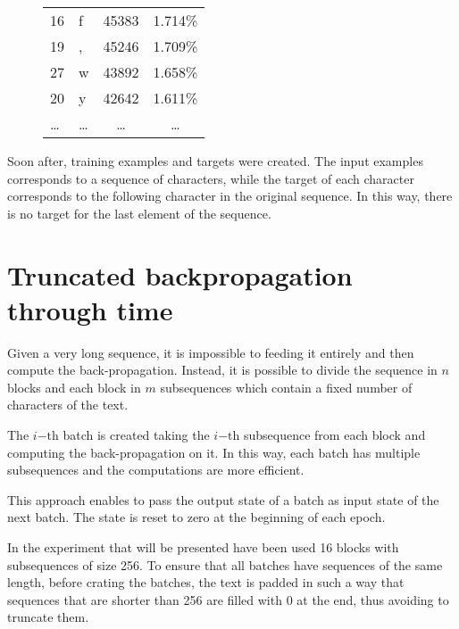 \documentclass[a4paper,12pt]{article} %
\begin{document}
\begin{figure}[htb]
\begin{tabular}{llcc}
			16       &         f &               45383 &             1.714\% \\
			19       &         , &               45246 &             1.709\% \\
			27       &         w &               43892 &             1.658\% \\
			20       &         y &               42642 &             1.611\% \\
			\dots       &         \dots &                \dots &             
			\dots 
			\\
			\bottomrule
		\end{tabular}
		\label{tab:statistics}
	\end{figure}
	
	

	\bigskip
	Soon after, training examples and targets were created. The input examples 
	corresponds to a sequence of characters, while the target of each character 
	corresponds to the following character in the original sequence. In this 
	way, there is no target for the last element of the sequence.
	
	\section{Truncated backpropagation through time}
	\label{section:backpropagation}
	
	Given a very long sequence, it is impossible to feeding it entirely and 
	then compute the back-propagation. Instead, it is possible to divide the 
	sequence in $n$ blocks and each block in $m$ subsequences which contain a 
	fixed number of characters of the text.\bigskip
	
	The $i\mathrm{-th}$ batch is created taking the $i\mathrm{-th}$ subsequence 
	from each block and computing the back-propagation on it. In this way, each 
	batch has multiple subsequences and the computations are more efficient.
	
	This approach enables to pass the output state of a batch as input state of the next batch. The state is reset to zero at the 
	beginning of each epoch.\bigskip
	
	In the experiment that will be presented have been used 16 blocks with 
	subsequences of size 256. 
	To ensure that all batches have sequences of the same length, before 
	crating the batches, the text is padded in such a way that sequences that 
	are shorter than 256 are filled with 0 at the end, thus avoiding to 
	truncate them.
	
\end{document}
